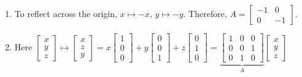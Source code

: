 \documentclass[11pt]{article}
\begin{document}
\begin{itemize}
\begin{examplebox}[1.1]
\begin{enumerate}
		\end{enumerate}
		\begin{solution}[1.1] \quad\vspace{-0.5cm}
		\begin{enumerate}
		    \item To reflect across the origin, $x \mapsto -x$, $y \mapsto -y$. Therefore, $A = \begin{bmatrix}
	  -1 & 0\\
	0 & -1
	\end{bmatrix}$.
\item Here $\begin{bmatrix}
  x\\
y\\
z
\end{bmatrix} \mapsto \begin{bmatrix}
  x\\
z\\
y
\end{bmatrix} = x \begin{bmatrix}
  1\\
0\\
0
\end{bmatrix} + y\begin{bmatrix}
  0\\
0\\
1
\end{bmatrix} + z \begin{bmatrix}
  0\\
1\\
0
\end{bmatrix} = \underbrace{\begin{bmatrix}
  1 & 0 & 0\\
0 & 0 & 1\\
0 & 1 & 0
\end{bmatrix}}_A \begin{bmatrix}
  x\\
y\\
z
\end{bmatrix}$


\end{enumerate}
\end{solution}
\end{examplebox}
\end{itemize}
\end{document}
